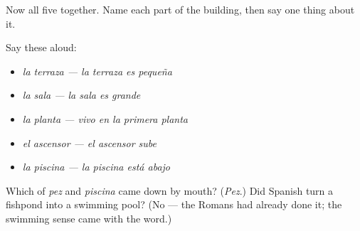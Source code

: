 Now all five together. Name each part of the building, then say one thing about it.

Say these aloud:

\begin{itemize}
\raggedright
  \item \emph{la terraza — la terraza es pequeña}
  \item \emph{la sala — la sala es grande}
  \item \emph{la planta — vivo en la primera planta}
  \item \emph{el ascensor — el ascensor sube}
  \item \emph{la piscina — la piscina está abajo}
\end{itemize}

\begin{tcolorbox}[breakable,colback=teal!4,colframe=teal!35!black,title={Before you move on}]
Which of \emph{pez} and \emph{piscina} came down by mouth? (\emph{Pez}.) Did Spanish turn a fishpond into a swimming pool? (No — the Romans had already done it; the swimming sense came with the word.)
\end{tcolorbox}
